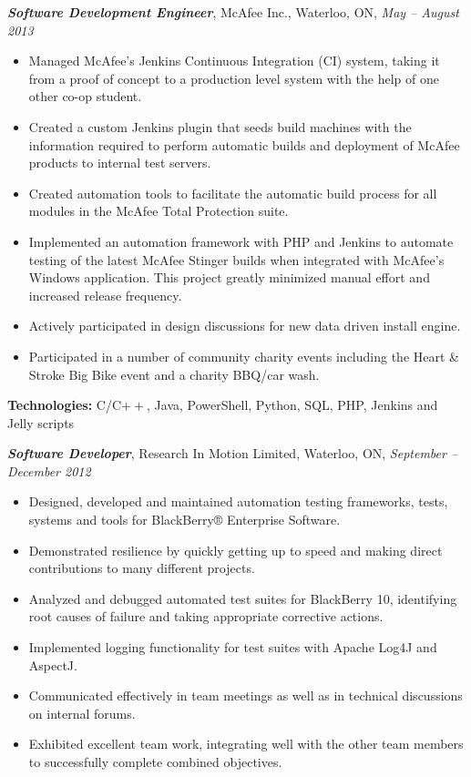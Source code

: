 \documentclass[10pt,letterpaper]{article}
\newcommand{\job}[4]
{
    \emph{\textbf{#1}}, #2, #3, \emph{#4}
}
\begin{document}
\vspace{0.5em}		
\job{Software Development Engineer}{McAfee Inc.}{Waterloo, ON}{May -- August 2013}\\
\begin{adjustwidth}{0.1in}{0.5in}
    \begin{itemize}
	\item Managed McAfee's Jenkins Continuous Integration (CI) system, taking it from a proof of concept to a production level system with the help 
	    of one other co-op student.
	\item Created a custom Jenkins plugin that seeds build machines with the information required to perform automatic builds and 
	    deployment of McAfee products to internal test servers.
	\item Created automation tools to facilitate the automatic build process for all modules in the 
	    McAfee Total Protection suite.
	\item Implemented an automation framework with PHP and Jenkins to automate testing of the latest McAfee Stinger builds when integrated  
	    with McAfee's Windows application. This project greatly minimized manual effort and increased release frequency.  
    	\item Actively participated in design discussions for new data driven install engine.
	\item Participated in a number of community charity events including the Heart \& Stroke Big Bike event and a charity BBQ/car wash.
    \end{itemize}
    \vspace{0.5em}
    \textbf{Technologies:} C/C$++$, Java, PowerShell, Python, SQL, PHP, Jenkins and Jelly scripts
\end{adjustwidth}
\newpage
\job{Software Developer}{Research In Motion Limited}{Waterloo, ON}{September -- December 2012}\\
\begin{adjustwidth}{0.1in}{0.5in}
    \begin{itemize}
	\item Designed, developed and maintained automation testing frameworks, tests, systems and tools for 
	    BlackBerry® Enterprise Software.
	\item Demonstrated resilience by quickly getting up to speed and making direct contributions to many different 
	    projects.
	\item Analyzed and debugged automated test suites for BlackBerry 10, identifying root causes of failure and 
	    taking appropriate corrective actions.
	\item Implemented logging functionality for test suites with Apache Log4J and AspectJ.
	\item Communicated effectively in team meetings as well as in technical discussions on internal forums.
	\item Exhibited excellent team work, integrating well with the other team members to successfully complete 
	    combined objectives.
    \end{itemize}
\end{adjustwidth}
\end{document}
